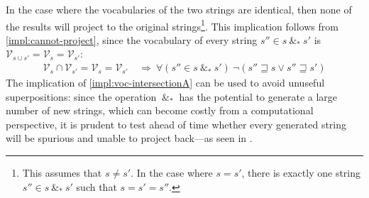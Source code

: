 \documentclass[a4paper,12pt,leqno]{article}
\newcommand{\spasync}{~\&_*~}
\newcommand{\V}{\mathcal{V}}
\begin{document}
In the case where the vocabularies of the two strings are identical, then none of the results will project to the original strings\footnote{This assumes that $s \neq s'$. In the case where $s = s'$, there is exactly one string $s'' \in s \spasync s'$ such that $s = s' = s''$.}. This implication follows from \cref{impl:cannot-project}, since the vocabulary of every string $s'' \in s \spasync s'$ is $\V_{s \cup s'} = \V_s = \V_{s'}$:
\begin{align}
	\V_s \cap \V_{s'} = \V_s = \V_{s'} &~\Longrightarrow~ \forall (s'' \in s \spasync s')~\lnot (s'' \sqsupseteq s \lor s'' \sqsupseteq s')\label{impl:voc-intersectionA}
\end{align}
The implication of \cref{impl:voc-intersectionA} can be used to avoid unuseful superpositions: since the operation $\spasync$ has the potential to generate a large number of new strings, which can become costly from a computational perspective, it is prudent to test ahead of time whether every generated string will be spurious and unable to project back---as seen in .
\end{document}

